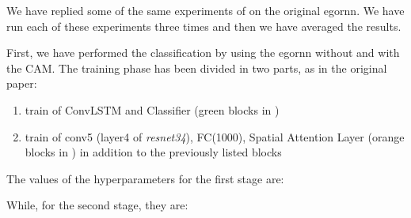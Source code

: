 \documentclass[10pt,twocolumn,hidelinks,letterpaper]{article}
\begin{document}
We have replied some of the same experiments of \cite{egornn} on the original egornn. We have run each of these experiments three times and then we have averaged the results.

First, we have performed the classification by using the egornn without and with the CAM. The training phase has been divided in two parts, as in the original paper:

\begin{enumerate}
  \item train of ConvLSTM and Classifier (green blocks in )
  \item train of conv5 (layer4 of \textit{resnet34}), FC(1000), Spatial Attention Layer (orange blocks in ) in addition to the previously listed blocks
\end{enumerate}

The values of the hyperparameters for the first stage are:

\begin{center}
\end{center}

While, for the second stage, they are:

\begin{center}
\end{center}
\end{document}
